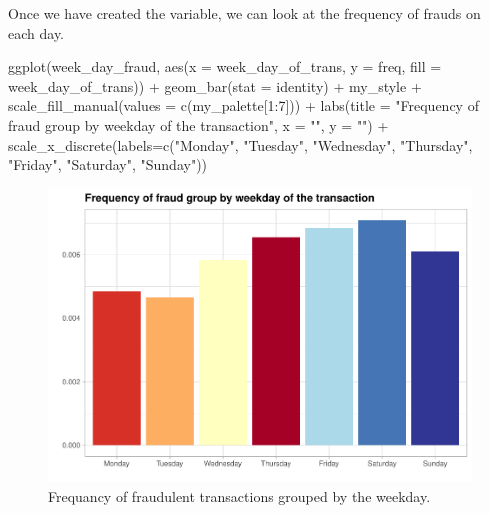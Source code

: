 \documentclass[
]{report}
\newenvironment{Shaded}{\begin{snugshade}}{\end{snugshade}}
\newcommand{\AttributeTok}[1]{\textcolor[rgb]{0.77,0.63,0.00}{#1}}
\newcommand{\DecValTok}[1]{\textcolor[rgb]{0.00,0.00,0.81}{#1}}
\newcommand{\FunctionTok}[1]{\textcolor[rgb]{0.00,0.00,0.00}{#1}}
\newcommand{\NormalTok}[1]{#1}
\newcommand{\SpecialCharTok}[1]{\textcolor[rgb]{0.00,0.00,0.00}{#1}}
\newcommand{\StringTok}[1]{\textcolor[rgb]{0.31,0.60,0.02}{#1}}
\begin{document}
Once we have created the variable, we can look at the frequency of
frauds on each day.

\begin{Shaded}
\begin{Highlighting}[]
\FunctionTok{ggplot}\NormalTok{(week\_day\_fraud, }\FunctionTok{aes}\NormalTok{(}\AttributeTok{x =}\NormalTok{ week\_day\_of\_trans, }\AttributeTok{y =}\NormalTok{ freq, }\AttributeTok{fill =}\NormalTok{ week\_day\_of\_trans)) }\SpecialCharTok{+}
  \FunctionTok{geom\_bar}\NormalTok{(}\AttributeTok{stat =} \StringTok{\textquotesingle{}identity\textquotesingle{}}\NormalTok{) }\SpecialCharTok{+}
\NormalTok{  my\_style }\SpecialCharTok{+}
  \FunctionTok{scale\_fill\_manual}\NormalTok{(}\AttributeTok{values =} \FunctionTok{c}\NormalTok{(my\_palette[}\DecValTok{1}\SpecialCharTok{:}\DecValTok{7}\NormalTok{])) }\SpecialCharTok{+}
  \FunctionTok{labs}\NormalTok{(}\AttributeTok{title =} \StringTok{"Frequency of fraud group by weekday of the transaction"}\NormalTok{,}
       \AttributeTok{x =} \StringTok{""}\NormalTok{,}
       \AttributeTok{y =} \StringTok{""}\NormalTok{) }\SpecialCharTok{+}
  \FunctionTok{scale\_x\_discrete}\NormalTok{(}\AttributeTok{labels=}\FunctionTok{c}\NormalTok{(}\StringTok{"Monday"}\NormalTok{, }\StringTok{"Tuesday"}\NormalTok{, }\StringTok{"Wednesday"}\NormalTok{, }\StringTok{"Thursday"}\NormalTok{,}
                            \StringTok{"Friday"}\NormalTok{, }\StringTok{"Saturday"}\NormalTok{, }\StringTok{"Sunday"}\NormalTok{))}
\end{Highlighting}
\end{Shaded}

\begin{figure}
\centering
\includegraphics{credit_card_fraud_detection_files/figure-latex/weekday_plot-1.pdf}
\caption{\label{Fig:weekday_plot}Frequancy of fraudulent transactions
grouped by the weekday.}
\end{figure}
\end{document}
